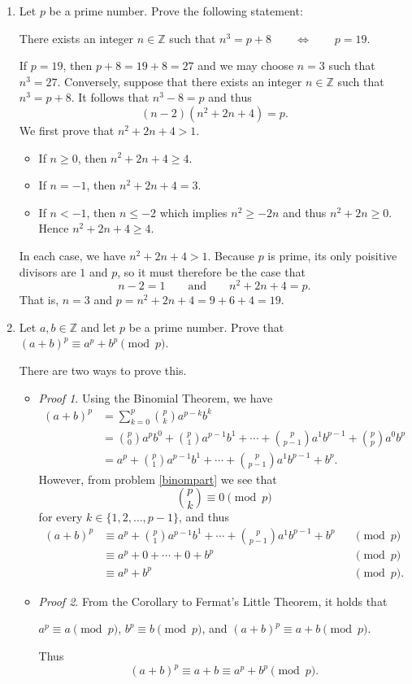 \documentclass[11pt]{article}
\def\integers{\mathbb{Z}}
\begin{document}
\begin{enumerate}
\item Let $p$ be a prime number. Prove the following statement:
\begin{center}
 There exists an integer $n\in\integers$ such that $n^3=p+8\qquad\iff\qquad p=19$. 
\end{center}
\begin{Solution}
 If $p=19$, then $p+8=19+8 = 27$ and we may choose $n=3$ such that $n^3=27$. Conversely, suppose that there exists an integer $n\in\integers$ such that $n^3=p+8$. It follows that $n^3-8=p$ and thus
 \[
  (n-2)(n^2+2n+4) = p.
 \]
We first prove that $n^2+2n+4>1$.
\begin{itemize}
 \item If $n\geq 0$, then $n^2+2n+4 \geq 4$. 
 \item If $n=-1$, then $n^2+2n+4 =3$.
 \item If $n< -1$, then $n\leq -2$ which implies $n^2\geq-2n$ and thus $n^2+2n\geq0$. Hence $n^2+2n+4\geq 4$.
\end{itemize}
 In each case, we have $n^2+2n+4>1$. Because $p$ is prime, its only poisitive divisors are $1$ and $p$, so it must therefore be the case that 
\[
 n-2=1 \qquad\text{and}\qquad n^2+2n+4 = p.
\]
That is, $n=3$ and $p = n^2+2n+4 = 9+6+4 = 19$.
\end{Solution}

\item Let $a,b\in\integers$ and let $p$ be a prime number. Prove that $(a+b)^p\equiv a^p+b^p\pmod{p}$. 

\begin{Solution}
 There are two ways to prove this.
 \begin{itemize}
  \item \emph{Proof 1}. Using the Binomial Theorem, we have
  \begin{align*}
   (a+b)^p &= \sum_{k=0}^p \binom{p}{k}a^{p-k}b^{k} \\
    & = \binom{p}{0}a^pb^0 + \binom{p}{1}a^{p-1}b^1 +\cdots +\binom{p}{p-1}a^1b^{p-1} +\binom{p}{p}a^0b^p\\
    & = a^p + \binom{p}{1}a^{p-1}b^1 +\cdots +\binom{p}{p-1}a^1b^{p-1} + b^p.
  \end{align*}
However, from problem \ref{binompart} we see that 
\[
 \binom{p}{k}\equiv 0\pmod{p}
\]
for every $k\in\{1,2,\dots,p-1\}$, and thus
\begin{align*}
 (a+b)^p&\equiv a^p + \binom{p}{1}a^{p-1}b^1 +\cdots +\binom{p}{p-1}a^1b^{p-1} + b^p &&\pmod{p}\\
 &\equiv a^p + 0 +\cdots + 0 + b^p&&\pmod{p}\\
 &\equiv a^p + b^p&&\pmod{p}.
\end{align*}
\item \emph{Proof 2}. From the Corollary to Fermat's Little Theorem, it holds that 
\begin{center}$a^p\equiv a\pmod{p}$, \quad $b^p\equiv b\pmod{p}$, \quad and $(a+b)^p\equiv a+b\pmod{p}$.\end{center}
Thus
\[
 (a+b)^p\equiv a+b \equiv a^p+b^p\pmod{p}.
\]



\end{itemize}
\end{Solution}
\end{enumerate}
\end{document}
